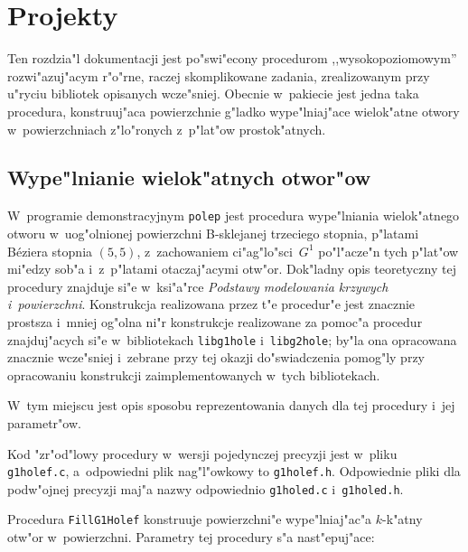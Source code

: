 

\chapter{Projekty}

Ten rozdzia"l dokumentacji jest po"swi"econy procedurom ,,wysokopoziomowym''
rozwi"azuj"acym r"o"rne, raczej skomplikowane zadania, zrealizowanym przy
u"ryciu bibliotek opisanych wcze"sniej. Obecnie w~pakiecie jest jedna
taka procedura, konstruuj"aca powierzchnie g"ladko wype"lniaj"ace
wielok"atne otwory w~powierzchniach z"lo"ronych z~p"lat"ow prostok"atnych.


\section{Wype"lnianie wielok"atnych otwor"ow}

W~programie demonstracyjnym \texttt{polep} jest procedura wype"lniania
wielok"atnego otworu w~uog"olnionej powierzchni B-sklejanej trzeciego
stopnia, p"latami B\'{e}ziera stopnia $(5,5)$, z~zachowaniem
ci"ag"lo"sci~$G^1$ po"l"acze"n tych p"lat"ow mi"edzy sob"a i~z~p"latami
otaczaj"acymi otw"or. Dok"ladny opis teoretyczny tej procedury znajduje
si"e w~ksi"a"rce \emph{Podstawy modelowania krzywych i~powierzchni}.
Konstrukcja realizowana przez t"e procedur"e jest znacznie prostsza
i~mniej og"olna ni"r konstrukcje realizowane za pomoc"a procedur
znajduj"acych si"e w~bibliotekach \texttt{libg1hole} i~\texttt{libg2hole};
by"la ona opracowana znacznie wcze"sniej i~zebrane przy tej okazji
do"swiadczenia pomog"ly przy opracowaniu konstrukcji zaimplementowanych
w~tych bibliotekach.

W~tym miejscu jest opis sposobu reprezentowania danych dla tej procedury
i~jej parametr"ow.

Kod "zr"od"lowy procedury w~wersji pojedynczej precyzji jest w~pliku
\texttt{g1holef.c}, a~odpowiedni plik nag"l"owkowy to \texttt{g1holef.h}.
Odpowiednie pliki dla podw"ojnej precyzji maj"a nazwy odpowiednio
\texttt{g1holed.c} i~\texttt{g1holed.h}.

\vspace{\bigskipamount}
Procedura \texttt{FillG1Holef} konstruuje powierzchni"e wype"lniaj"ac"a
$k$-k"atny otw"or w~powierzchni. Parametry tej procedury s"a nast"epuj"ace:

